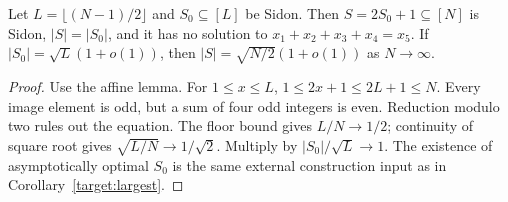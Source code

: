 \begin{proposition}
\label{found:odd}
Let $L=\lfloor(N-1)/2\rfloor$ and $S_0\subseteq[L]$ be Sidon.
Then $S=2S_0+1\subseteq[N]$ is Sidon, $|S|=|S_0|$, and it has
no solution to $x_1+x_2+x_3+x_4=x_5$.
If $|S_0|=\sqrt L(1+o(1))$, then
$|S|=\sqrt{N/2}(1+o(1))$ as $N\to\infty$.
\end{proposition}
\begin{proof}
Use the affine lemma. For $1\leq x\leq L$,
$1\leq2x+1\leq2L+1\leq N$. Every image element is odd, but a
sum of four odd integers is even. Reduction modulo two rules out the
equation. The floor bound gives $L/N\to1/2$; continuity of square
root gives $\sqrt{L/N}\to1/\sqrt2$. Multiply by
$|S_0|/\sqrt L\to1$. The existence of asymptotically optimal $S_0$
is the same external construction input as in
Corollary~\ref{target:largest}.
\end{proof}
